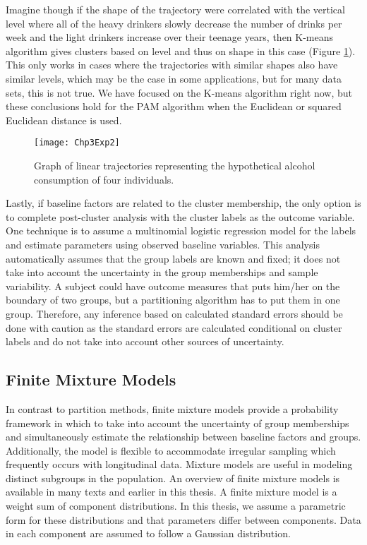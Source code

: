 \documentclass[12pt]{article}
\begin{document}
Imagine though if the shape of the trajectory were correlated with the vertical level where all of the heavy drinkers slowly decrease the number of drinks per week and the light drinkers increase over their teenage years, then K-means algorithm gives clusters based on level and thus on shape in this case (Figure \ref{fig:3-2}). This only works in cases where the trajectories with similar shapes also have similar levels, which may be the case in some applications, but for many data sets, this is not true. We have focused on the K-means algorithm right now, but these conclusions hold for the PAM algorithm when the Euclidean or squared Euclidean distance is used.\\
\begin{figure}
\begin{center}
\texttt{[image: Chp3Exp2]}
\end{center}
\caption{Graph of linear trajectories representing the hypothetical alcohol consumption of four individuals.}
\label{fig:3-2} 
\end{figure}

Lastly, if baseline factors are related to the cluster membership, the only option is to complete post-cluster analysis with the cluster labels as the outcome variable. One technique is to assume a multinomial logistic regression model for the labels and estimate parameters using observed baseline variables. This analysis automatically assumes that the group labels are known and fixed; it does not take into account the uncertainty in the group memberships and sample variability. A subject could have outcome measures that puts him/her on the boundary of two groups, but a partitioning algorithm has to put them in one group. Therefore, any inference based on calculated standard errors should be done with caution as the standard errors are calculated conditional on cluster labels and do not take into account other sources of uncertainty.

\subsection{Finite Mixture Models}
In contrast to partition methods, finite mixture models provide a probability framework in which to take into account the uncertainty of group memberships and simultaneously estimate the relationship between baseline factors and groups. Additionally, the model is flexible to accommodate irregular sampling which frequently occurs with longitudinal data. Mixture models are useful in modeling distinct subgroups in the population. An overview of finite mixture models is available in many texts \cite{everitt1981,mclachlan1988,mclachlan2000} and earlier in this thesis. A finite mixture model is a weight sum of component distributions. In this thesis, we assume a parametric form for these distributions and that parameters differ between components. Data in each component are assumed to follow a Gaussian distribution.\\
\end{document}
